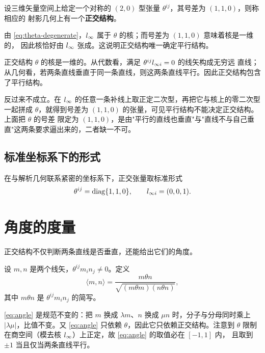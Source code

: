 \begin{definition}[正交结构]
设三维矢量空间上给定一个对称的 $(2,0)$ 型张量 $\theta^{ij}$，其号差为 $(1,1,0)$，则称相应的
射影几何上有一个\textbf{正交结构}。
\end{definition}

由 \eqref{eq:theta-degenerate}，$l_{\infty}$ 属于 $\theta$ 的核；而号差为 $(1,1,0)$ 意味着核是一维的，
因此核恰好由 $l_{\infty}$ 张成。这说明正交结构唯一确定平行结构。

\begin{proposition}[正交结构决定平行结构]
正交结构 $\theta$ 的核是一维的。从代数看，满足 $\theta^{ij}l_{\infty i}=0$ 的线矢构成无穷远
直线；从几何看，若两条直线垂直于同一条直线，则这两条直线平行。因此正交结构包含了平行结构。
\end{proposition}

\begin{remark}
反过来不成立。在 $l_{\infty}$ 的任意一条补线上取正定二次型，再把它与核上的零二次型一起拼成
$\theta$，就得到号差为 $(1,1,0)$ 的张量，可见平行结构不能决定正交结构。上面把 $\theta$ 的号差
限定为 $(1,1,0)$，是由"平行的直线也垂直"与"直线不与自己垂直"这两条要求逼出来的，二者缺一不可。
\end{remark}

\subsection{标准坐标系下的形式}

在与解析几何联系紧密的坐标系下，正交张量取标准形式
\begin{equation}
\theta^{ij}=\operatorname{diag}\{1,1,0\},\qquad l_{\infty i}=(0,0,1).
\label{eq:standard-theta}
\end{equation}

\section{角度的度量}

正交结构不仅判断两条直线是否垂直，还能给出它们的角度。

\begin{definition}[角度]
设 $m,n$ 是两个线矢，$\theta^{ij}m_in_j\ne0$。定义
\begin{equation}
\langle m,n\rangle=\frac{m\theta n}{\sqrt{(m\theta m)(n\theta n)}},
\label{eq:angle}
\end{equation}
其中 $m\theta n$ 是 $\theta^{ij}m_in_j$ 的简写。
\end{definition}

\eqref{eq:angle} 是规范不变的：把 $m$ 换成 $\lambda m$、$n$ 换成 $\mu n$ 时，分子与分母同时乘上
$|\lambda\mu|$，比值不变。又 \eqref{eq:angle} 只依赖 $\theta$，因此它只依赖正交结构。注意到
$\theta$ 限制在商空间（模去核 $l_{\infty}$）上正定，故 \eqref{eq:angle} 的取值必在 $[-1,1]$ 内，
且取到 $\pm1$ 当且仅当两条直线平行。

